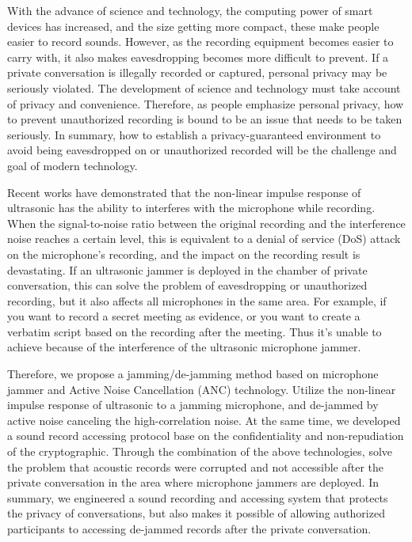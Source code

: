 \begin{abstract*}

    With the advance of science and technology,
the computing power of smart devices has increased,
and the size getting more compact,
these make people easier to record sounds.
However, as the recording equipment becomes easier to carry with,
it also makes eavesdropping becomes more difficult to prevent.
If a private conversation is illegally recorded or captured,
personal privacy may be seriously violated.
The development of science and technology must take account of privacy and convenience.
Therefore, as people emphasize personal privacy,
how to prevent unauthorized recording is bound to be an issue that needs to be taken seriously.
In summary, how to establish a privacy-guaranteed environment
to avoid being eavesdropped on or unauthorized recorded
will be the challenge and goal of modern technology.

    Recent works have demonstrated that the non-linear impulse response of ultrasonic
has the ability to interferes with the microphone while recording.
When the signal-to-noise ratio between the original recording
and the interference noise reaches a certain level,
this is equivalent to a denial of service (DoS) attack on the microphone's recording,
and the impact on the recording result is devastating.
If an ultrasonic jammer is deployed in the chamber of private conversation,
this can solve the problem of eavesdropping or unauthorized recording,
but it also affects all microphones in the same area. For example,
if you want to record a secret meeting as evidence,
or you want to create a verbatim script based on the recording after the meeting.
Thus it's unable to achieve because of the interference of the ultrasonic microphone jammer.

    Therefore, we propose a jamming/de-jamming method
based on microphone jammer and Active Noise Cancellation (ANC) technology.
Utilize the non-linear impulse response of ultrasonic to a jamming microphone,
and de-jammed by active noise canceling the high-correlation noise.
At the same time, we developed a sound record accessing protocol
base on the confidentiality and non-repudiation of the cryptographic.
Through the combination of the above technologies,
solve the problem that acoustic records were corrupted and not accessible
after the private conversation in the area where microphone jammers are deployed.
In summary, we engineered a sound recording and accessing system
that protects the privacy of conversations,
but also makes it possible of allowing authorized participants
to accessing de-jammed records after the private conversation.

\end{abstract*}